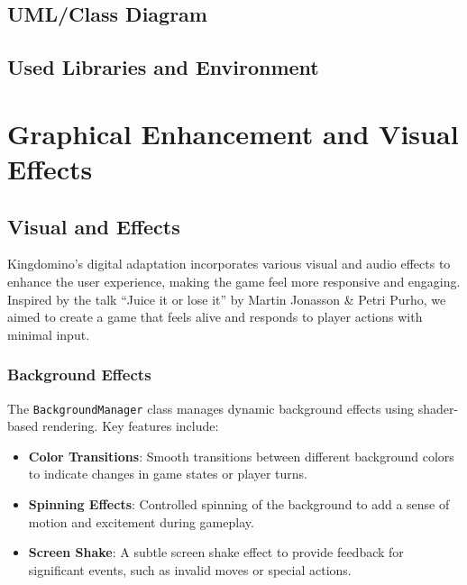 \documentclass[conference]{IEEEtran}
\begin{document}
\subsection{UML/Class Diagram}

\subsection{Used Libraries and Environment}


\section{Graphical Enhancement and Visual Effects}

\subsection{Visual and Effects}
Kingdomino's digital adaptation incorporates various visual and audio effects
to enhance the user experience, making the game feel more responsive and
engaging. Inspired by the talk ``Juice it or lose it'' by Martin Jonasson \&
Petri Purho, we aimed to create a game that feels alive and responds to player
actions with minimal input.

\subsubsection{Background Effects}
The \texttt{BackgroundManager} class manages dynamic background effects using
shader-based rendering. Key features include:
\begin{itemize}
    \item \textbf{Color Transitions}: Smooth transitions between different background colors to indicate changes in game states or player turns.
    \item \textbf{Spinning Effects}: Controlled spinning of the background to add a sense of motion and excitement during gameplay.
    \item \textbf{Screen Shake}: A subtle screen shake effect to provide feedback for significant events, such as invalid moves or special actions.
\end{itemize}
\end{document}
